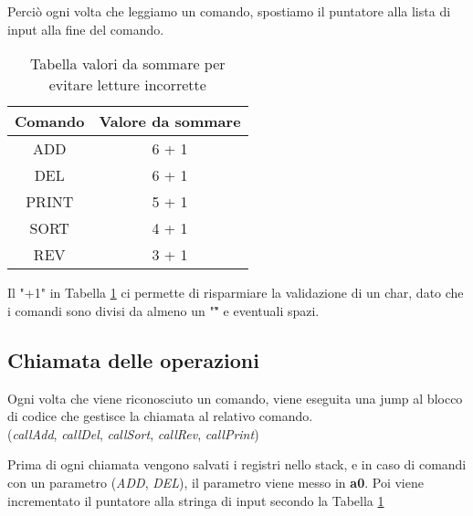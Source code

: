 Perciò ogni volta che leggiamo un comando,
 spostiamo il puntatore alla lista di input alla fine del comando. \\
\begin{table}[H]
\begin{center}
\begin{tabular}{|c|c|}
    \hline
    Comando & Valore da sommare \\
    \hline 
    ADD & 6 + 1 \\
    \hline
    DEL & 6 + 1 \\
    \hline
    PRINT & 5 + 1 \\
    \hline
    SORT & 4 + 1 \\
    \hline
    REV & 3 + 1 \\
    \hline
\end{tabular}
\caption{Tabella valori da sommare per evitare 
letture incorrette}
\label{tab:valoriDaSommare}
\end{center}
\end{table}

Il "+1" in Tabella \ref{tab:valoriDaSommare} ci 
permette di risparmiare la validazione di un char,
 dato che i comandi sono divisi da almeno un "\~" 
 e eventuali spazi.

\subsection{Chiamata delle operazioni}
Ogni volta che viene riconosciuto un comando, viene eseguita una jump al blocco di codice che gestisce la
chiamata al relativo comando.\\
(\textit{callAdd}, \textit{callDel}, \textit{callSort}, \textit{callRev}, \textit{callPrint})

Prima di ogni chiamata vengono salvati i registri nello stack, e in caso di comandi
con un parametro (\textit{ADD}, \textit{DEL}), il parametro viene messo in \textbf{a0}.
Poi viene incrementato il puntatore alla stringa di input secondo la Tabella \ref{tab:valoriDaSommare}
